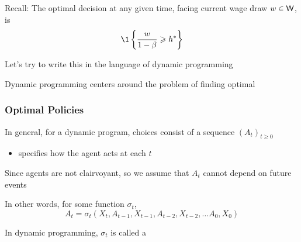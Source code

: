 \begin{frame}
    
    Recall: The optimal decision at any given time, facing current wage draw $w \in
    \mathsf W$, is 
    \begin{equation*}
        \1 \left\{ \frac{w}{1-\beta} \geq h^* \right\}
    \end{equation*}

    \vspace{1em}

    Let's try to write this in the language of dynamic programming
    
    \vspace{1em}

    Dynamic programming centers around the problem of finding optimal

\end{frame}


\begin{frame}
    \frametitle{Optimal Policies}

    In general, for a dynamic program, choices consist of a sequence $(A_t)_{t
    \geq 0}$ 
    \begin{itemize}
        \item specifies how the agent acts at each $t$ 
    \end{itemize}


    Since agents are not clairvoyant, so we assume that $A_t$ cannot
    depend on future events

    In other words, for some function $\sigma_t$,
    \begin{equation*}
        A_t = \sigma_t(
                    X_t, A_{t-1}, X_{t-1}, A_{t-2}, X_{t-2}, \ldots
                    A_0, X_0)
    \end{equation*}

    In dynamic programming, $\sigma_t$ is called a 

\end{frame}


